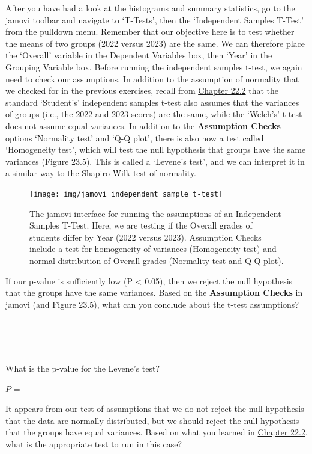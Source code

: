 \documentclass[
]{scrbook}
\begin{document}
After you have had a look at the histograms and summary statistics, go to the jamovi toolbar and navigate to `T-Tests', then the `Independent Samples T-Test' from the pulldown menu.
Remember that our objective here is to test whether the means of two groups (2022 versus 2023) are the same.
We can therefore place the `Overall' variable in the Dependent Variables box, then `Year' in the Grouping Variable box.
Before running the independent samples t-test, we again need to check our assumptions.
In addition to the assumption of normality that we checked for in the previous exercises, recall from \protect\hyperlink{independent-samples-t-test}{Chapter 22.2} that the standard `Student's' independent samples t-test also assumes that the variances of groups (i.e., the 2022 and 2023 scores) are the same, while the `Welch's' t-test does not assume equal variances.
In addition to the \textbf{Assumption Checks} options `Normality test' and `Q-Q plot', there is also now a test called `Homogeneity test', which will test the null hypothesis that groups have the same variances (Figure 23.5).
This is called a `Levene's test', and we can interpret it in a similar way to the Shapiro-Wilk test of normality.

\begin{figure}
\texttt{[image: img/jamovi\_independent\_sample\_t-test]} \caption{The jamovi interface for running the assumptions of an Independent Samples T-Test. Here, we are testing if the Overall grades of students differ by Year (2022 versus 2023). Assumption Checks include a test for homogeneity of variances (Homogeneity test) and normal distribution of Overall grades (Normality test and Q-Q plot).}\label{fig:unnamed-chunk-106}
\end{figure}

If our p-value is sufficiently low (P \textless{} 0.05), then we reject the null hypothesis that the groups have the same variances.
Based on the \textbf{Assumption Checks} in jamovi (and Figure 23.5), what can you conclude about the t-test assumptions?

\begin{verbatim}




\end{verbatim}

What is the p-value for the Levene's test?

\(P\) = \_\_\_\_\_\_\_\_\_\_\_\_\_\_\_\_\_

It appears from our test of assumptions that we do not reject the null hypothesis that the data are normally distributed, but we should reject the null hypothesis that the groups have equal variances.
Based on what you learned in \protect\hyperlink{independent-samples-t-test}{Chapter 22.2}, what is the appropriate test to run in this case?
\end{document}
